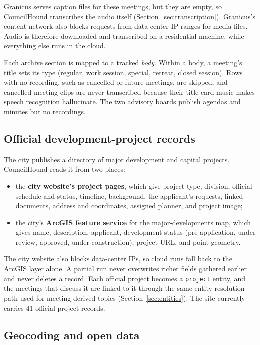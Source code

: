 \documentclass[11pt]{article}
\newcommand{\code}[1]{\texttt{#1}}
\begin{document}
Granicus serves caption files for these meetings, but they are empty, so CouncilHound
transcribes the audio itself (Section~\ref{sec:transcription}). Granicus's content
network also blocks requests from data-center IP ranges for media files. Audio is
therefore downloaded and transcribed on a residential machine, while everything else
runs in the cloud.

Each archive section is mapped to a tracked \emph{body}. Within a body, a meeting's
title sets its type (regular, work session, special, retreat, closed session). Rows with
no recording, such as cancelled or future meetings, are skipped, and cancelled-meeting
clips are never transcribed because their title-card music makes speech recognition
hallucinate. The two advisory boards publish agendas and minutes but no recordings.

\subsection{Official development-project records}

The city publishes a directory of major development and capital projects. CouncilHound
reads it from two places:
\begin{itemize}
  \item the \textbf{city website's project pages}, which give project type, division,
        official schedule and status, timeline, background, the applicant's requests,
        linked documents, address and coordinates, assigned planner, and project image;
  \item the city's \textbf{ArcGIS feature service} for the major-developments map,
        which gives name, description, applicant, development status (pre-application,
        under review, approved, under construction), project URL, and point geometry.
\end{itemize}
The city website also blocks data-center IPs, so cloud runs fall back to the ArcGIS
layer alone. A partial run never overwrites richer fields gathered earlier and never
deletes a record. Each official project becomes a \code{project} entity, and the meetings
that discuss it are linked to it through the same entity-resolution path used for
meeting-derived topics (Section~\ref{sec:entities}). The site currently carries 41
official project records.

\subsection{Geocoding and open data}
\end{document}
